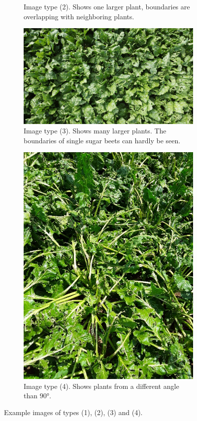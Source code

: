 \begin{figure}[htb!]
\begin{subfigure}{.4\textwidth}
		\caption{Image type (2). Shows one larger plant, boundaries are overlapping with neighboring plants.}
		\label{fig:type_2}
	\end{subfigure}
	\begin{subfigure}{.6\textwidth}
		\centering
		\includegraphics[scale=0.13]{figures/type_4.png}
		\caption{Image type (3). Shows many larger plants. The boundaries of single sugar beets can hardly be seen.}
		\label{fig:type_5}
	\end{subfigure}
	\begin{subfigure}{.4\textwidth}
	\centering
	\includegraphics[scale=0.21]{figures/type_3.jpg}
	\caption{Image type (4). Shows plants from a different angle than $ 90° $.}
	\label{fig:type_3}
	\end{subfigure}
	\caption{Example images of types (1), (2), (3) and (4).}
	\label{fig:image_types}
\end{figure}

